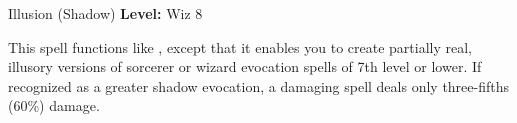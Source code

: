 {Illusion (Shadow)}
{
	\textbf{Level:}
	Wiz 8\\
}
{
	This spell functions like , except that it enables you to create partially real, illusory versions of sorcerer or wizard evocation spells of 7th level or lower. If recognized as a greater shadow evocation, a damaging spell deals only three-fifths (60\%) damage.

}
